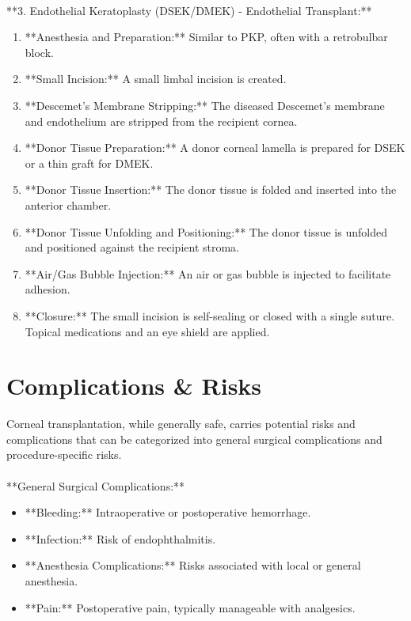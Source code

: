 \paragraph{}
**3. Endothelial Keratoplasty (DSEK/DMEK) - Endothelial Transplant:**
\begin{enumerate}
  \item **Anesthesia and Preparation:** Similar to PKP, often with a retrobulbar block.
  \item **Small Incision:** A small limbal incision is created.
  \item **Descemet's Membrane Stripping:** The diseased Descemet's membrane and endothelium are stripped from the recipient cornea.
  \item **Donor Tissue Preparation:** A donor corneal lamella is prepared for DSEK or a thin graft for DMEK.
  \item **Donor Tissue Insertion:** The donor tissue is folded and inserted into the anterior chamber.
  \item **Donor Tissue Unfolding and Positioning:** The donor tissue is unfolded and positioned against the recipient stroma.
  \item **Air/Gas Bubble Injection:** An air or gas bubble is injected to facilitate adhesion.
  \item **Closure:** The small incision is self-sealing or closed with a single suture. Topical medications and an eye shield are applied.
\end{enumerate}

\section*{Complications \& Risks}
Corneal transplantation, while generally safe, carries potential risks and complications that can be categorized into general surgical complications and procedure-specific risks.

\paragraph{}
**General Surgical Complications:**
\begin{itemize}
  \item **Bleeding:** Intraoperative or postoperative hemorrhage.
  \item **Infection:** Risk of endophthalmitis.
  \item **Anesthesia Complications:** Risks associated with local or general anesthesia.
  \item **Pain:** Postoperative pain, typically manageable with analgesics.
\end{itemize}

